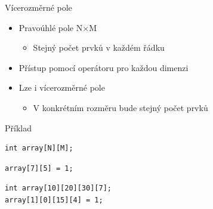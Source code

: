 \begin{frame}[fragile]{Vícerozměrné pole}

  \begin{itemize}
    \item Pravoúhlé pole N$\times$M
    \begin{itemize}
      \item Stejný počet prvků v každém řádku
    \end{itemize}

    \pause

    \item Přístup pomocí operátoru \code{[]} pro každou dimenzi

    \pause

    \item Lze i vícerozměrné pole
    \begin{itemize}
      \item V konkrétním rozměru bude stejný počet prvků
    \end{itemize}

  \end{itemize}


\begin{block}{Příklad}
\begin{lstlisting}
int array[N][M];
\end{lstlisting}
\begin{lstlisting}
array[7][5] = 1;
\end{lstlisting}
\begin{lstlisting}
int array[10][20][30][7];
array[1][0][15][4] = 1;
\end{lstlisting}
\end{block}

\end{frame}

